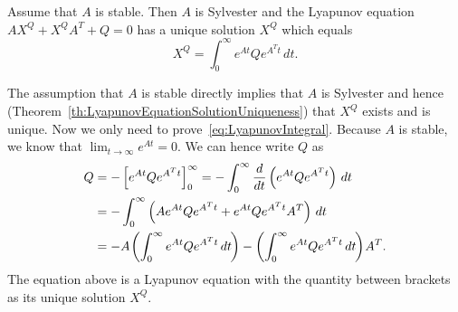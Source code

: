 \documentclass[twocolumn]{autart}
\begin{document}
\begin{thm}\label{th:InfiniteIntegralToLyapunov}
Assume that $A$ is stable. Then $A$ is Sylvester and the Lyapunov equation $A X^Q + X^Q A^T + Q = 0$ has a unique solution $X^Q$ which equals
\begin{equation}
X^Q = \int_0^\infty e^{A t} Q e^{A^T t} \, dt. \label{eq:LyapunovIntegral}
\end{equation}
\end{thm}
\begin{pf}
The assumption that $A$ is stable directly implies that $A$ is Sylvester and hence (Theorem~\ref{th:LyapunovEquationSolutionUniqueness}) that $X^Q$ exists and is unique. Now we only need to prove~\eqref{eq:LyapunovIntegral}. Because $A$ is stable, we know that $\lim_{t \rightarrow \infty} e^{At} = 0$. We can hence write $Q$ as
\begin{align}
Q & = -\left[e^{A t} Q e^{A^T t}\right]_0^\infty = -\int_0^\infty \frac{d}{dt} \left(e^{A t} Q e^{A^T t}\right) \, dt \nonumber \\
& = -\int_0^\infty \left(A e^{A t} Q e^{A^T t} + e^{A t} Q e^{A^T t} A^T\right) \, dt \\
& = -A \hspace{-1pt}\left(\int_0^\infty e^{A t} Q e^{A^T t} \, dt\hspace{-1pt}\right) - \left(\int_0^\infty e^{A t} Q e^{A^T t} \, dt\hspace{-1pt}\right)\hspace{-1pt} A^T. \nonumber
\end{align}
The equation above is a Lyapunov equation with the quantity between brackets as its unique solution $X^Q$.
\end{pf}
\end{document}
